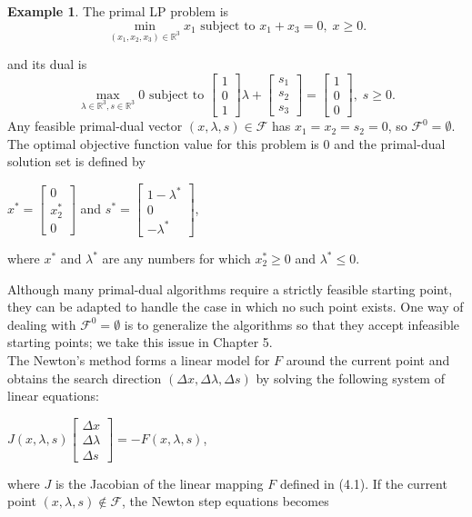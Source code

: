 \documentclass[a4paper,10 pt,titlepage,twoside]{report}
\theoremstyle{plain}
\theoremstyle{definition}
\newtheorem{ex}[thm]{Example}
\theoremstyle{remark}
\begin{document}
\begin{ex}
	The primal LP problem is
	\begin{equation*}
	\min\limits_{(x_{1},x_{2},x_{3})\in\mathbb{R}^{3}} x_{1} \text{ subject to }x_{1} + x_{3} = 0, \;x\geq0.
	\end{equation*}

and its dual is 
	\begin{equation*}
\max\limits_{\lambda\in\mathbb{R}^{3}, s\in\mathbb{R}^{3}} 0 \text{ subject to } \begin{bmatrix}1\\0\\1\end{bmatrix}\lambda+\begin{bmatrix}
s_{1}\\s_{2}\\s_{3}
\end{bmatrix}=\begin{bmatrix}1\\0\\0\end{bmatrix},\;s\geq0. 
\end{equation*}
Any feasible primal-dual vector $(x, \lambda, s)\in\mathcal{F}$ has $x_{1}= x_{2}= s_{2}= 0$, so $\mathcal{F}^{0}=\emptyset$. The optimal objective function value for this problem is 0 and the primal-dual solution set is defined by
\begin{center}
$x^{*} = \begin{bmatrix}
0\\x^{*}_{2}\\ 0
\end{bmatrix}$ and $s^{*}=\begin{bmatrix}
1-\lambda^{*}\\0\\-\lambda^{*}
\end{bmatrix}$,  
\end{center}
where $x^{*}$ and $\lambda^{*}$ are any numbers for which $x_{2}^{*}\geq0$ and $\lambda^{*}\leq0$.
\end{ex}
Although many primal-dual algorithms require a strictly feasible starting point, they can be adapted to handle the case in which no such point exists. One way of dealing with $\mathcal{F}^{0}=\emptyset$ is to generalize the algorithms so that
they accept infeasible starting points; we take this issue in Chapter 5. \\
The Newton's method forms a linear model for $\mathit{F}$ around the current point and obtains the search direction $(\Delta x,\Delta \lambda,\Delta s)$ by solving the following system of linear equations:
\begin{center}
	$\mathit{J}(x,\lambda,s)\begin{bmatrix}
	\Delta x\\\Delta\lambda \\\Delta s
	\end{bmatrix}=-\mathit{F}(x,\lambda,s)$,
\end{center}
where $\mathit{J}$ is the Jacobian of the linear mapping $\mathit{F}$ defined in (4.1). If the current point $(x, \lambda, s)\notin\mathcal{F}$, the Newton step equations becomes
\end{document}
